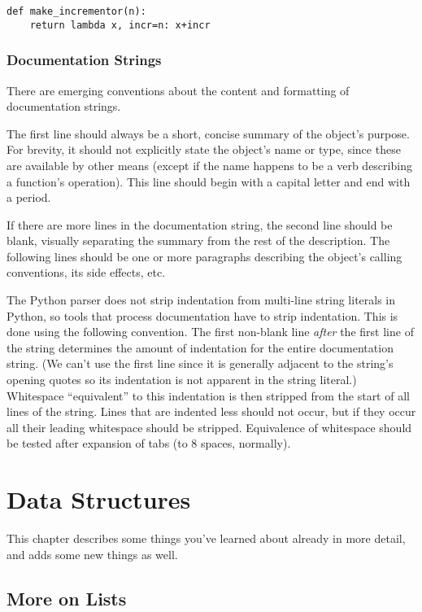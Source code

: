 \documentclass{manual}
\begin{document}
\begin{verbatim}
def make_incrementor(n):
    return lambda x, incr=n: x+incr
\end{verbatim}

\subsection{Documentation Strings \label{docstrings}}

There are emerging conventions about the content and formatting of
documentation strings.

The first line should always be a short, concise summary of the
object's purpose.  For brevity, it should not explicitly state the
object's name or type, since these are available by other means
(except if the name happens to be a verb describing a function's
operation).  This line should begin with a capital letter and end with
a period.

If there are more lines in the documentation string, the second line
should be blank, visually separating the summary from the rest of the
description.  The following lines should be one or more paragraphs
describing the object's calling conventions, its side effects, etc.

The Python parser does not strip indentation from multi-line string
literals in Python, so tools that process documentation have to strip
indentation.  This is done using the following convention.  The first
non-blank line \emph{after} the first line of the string determines the
amount of indentation for the entire documentation string.  (We can't
use the first line since it is generally adjacent to the string's
opening quotes so its indentation is not apparent in the string
literal.)  Whitespace ``equivalent'' to this indentation is then
stripped from the start of all lines of the string.  Lines that are
indented less should not occur, but if they occur all their leading
whitespace should be stripped.  Equivalence of whitespace should be
tested after expansion of tabs (to 8 spaces, normally).



\chapter{Data Structures \label{structures}}

This chapter describes some things you've learned about already in
more detail, and adds some new things as well.

\section{More on Lists \label{moreLists}}
\end{document}
